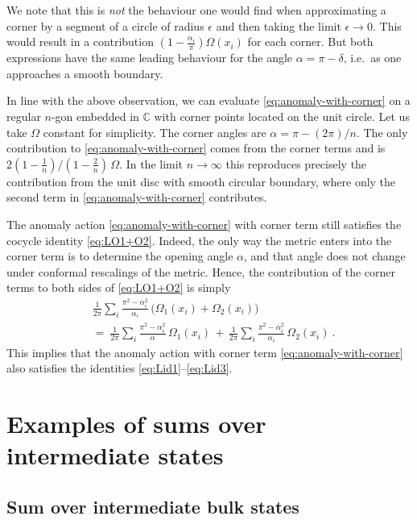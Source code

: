 \documentclass[11pt,a4paper]{article}
\numberwithin{equation}{section}
\begin{document}
We note that this is \emph{not} the behaviour one would find when approximating a corner by a segment of a circle of radius $\epsilon$ and then taking the limit $\epsilon \to 0$. This would result in a contribution $(1-\frac{\alpha_i}\pi) \Omega(x_i)$ for each corner. But both expressions have the same leading behaviour for the angle $\alpha = \pi - \delta$, i.e.\ as one approaches a smooth boundary.

In line with the above observation, we can evaluate \eqref{eq:anomaly-with-corner} on a regular $n$-gon embedded in $\mathbb{C}$ with corner points located on the unit circle. Let us take $\Omega$ constant for simplicity. The corner angles are $\alpha = \pi - (2\pi)/n$. The only contribution to \eqref{eq:anomaly-with-corner} comes from the corner terms and is $2 (1-\frac1n)/(1-\frac2n) \, \Omega$. In the limit $n \to \infty$ this reproduces precisely the contribution from the unit disc with smooth circular boundary, where only the second term in  \eqref{eq:anomaly-with-corner} contributes.

\smallskip
The anomaly action \eqref{eq:anomaly-with-corner} with corner term still satisfies the cocycle identity \eqref{eq:LO1+O2}. Indeed, the only way the metric enters into the corner term is to determine the opening angle $\alpha$, and that angle does not change under conformal rescalings of the metric. Hence, the contribution of the corner terms to both sides of \eqref{eq:LO1+O2} is simply
\begin{align}
    &\frac1{2\pi}  \sum_i \frac{\pi^2-\alpha_i^2}{\alpha_i} \, \big( \Omega_1(x_i) + \Omega_2(x_i) \big)
\nonumber\\    
    &=~
    \frac1{2\pi}  \sum_i \frac{\pi^2-\alpha_i^2}{\alpha} \, \Omega_1(x_i)
\,+\,
    \frac1{2\pi}  \sum_i \frac{\pi^2-\alpha_i^2}{\alpha_i} \, \Omega_2(x_i) \ .
\end{align}
This implies that the anomaly action with corner term \eqref{eq:anomaly-with-corner} also satisfies the identities \eqref{eq:Lid1}--\eqref{eq:Lid3}.


\section{Examples of sums over intermediate states}\label{app:state-sum-examples}

\subsection{Sum over intermediate bulk states}\label{app:bulk-state-sum}
\end{document}
